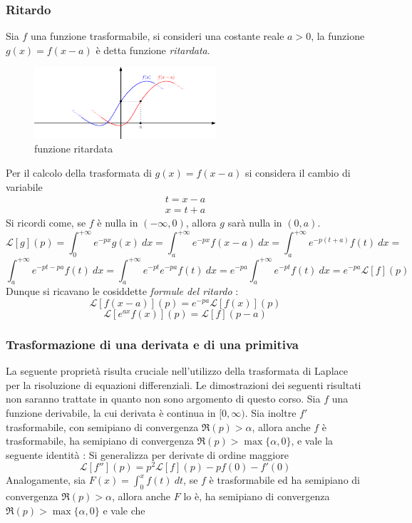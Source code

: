 \documentclass[10pt, letterpaper]{report}
\begin{document}
\subsubsection{Ritardo}
Sia $f$ una funzione trasformabile, si consideri una costante reale $a>0$, la funzione $g(x)=f(x-a)$ è detta 
funzione \textit{ritardata}.\begin{center}
\begin{figure}[h!]\centering
    \includegraphics[width=0.6\textwidth ]{images/funRit.eps}
    \caption{funzione ritardata}
 \end{figure}\end{center}
Per il calcolo della trasformata di $g(x)=f(x-a)$ si considera il cambio di variabile $$\begin{matrix}
    t=x-a\\ x=t+a
\end{matrix} $$
Si ricordi come, se $f$ è nulla in $(-\infty,0)$, allora $g$ sarà nulla in $(0,a)$.
$$ 
\mathcal{L}[g](p)=\int_0^{+\infty}e^{-px}g(x)\ dx =\int_a^{+\infty}e^{-px}f(x-a)\ dx  =
\int_a^{+\infty}e^{-p(t+a)}f(t)\ dx = 
$$ 
$$ 
\int_a^{+\infty}e^{-pt-pa}f(t)\ dx 
= \int_a^{+\infty}e^{-pt}e^{-pa}f(t)\ dx = e^{-pa}\int_a^{+\infty}e^{-pt}f(t)\ dx = 
e^{-pa}\mathcal{L}[f](p)$$
Dunque si ricavano le cosiddette \textit{formule del ritardo} : 
$$ 
\mathcal{L}[f(x-a)](p)=e^{-pa}\mathcal{L}[f(x)](p)
$$ $$ 
\mathcal{L}[e^{ax}f(x)](p)=\mathcal{L}[f](p-a)
$$
\subsubsection{Trasformazione di una derivata e di una primitiva}
La seguente proprietà risulta cruciale nell'utilizzo della trasformata di Laplace per la risoluzione di 
equazioni differenziali. Le dimostrazioni dei seguenti risultati non saranno trattate in quanto non 
sono argomento di questo corso.\acc 
Sia $f$ una funzione derivabile, la cui derivata è continua in $[0,\infty)$. Sia inoltre $f'$ trasformabile, con 
semipiano di convergenza $\Re(p)>\alpha$, allora anche $f$ è trasformabile, ha semipiano di 
convergenza $\Re(p)>\max\{\alpha,0\}$, e vale la seguente identità :
Si generalizza per derivate di ordine maggiore 
$$ 
\mathcal{L}[f''](p)=p^2\mathcal{L}[f](p)-pf(0)-f'(0)
$$
Analogamente, sia $F(x)=\int_0^x f(t)\ dt$, se $f$ è trasformabile ed ha semipiano di convergenza  $\Re(p)>\alpha$, 
allora anche $F$ lo è, ha semipiano di convergenza $\Re(p)>\max\{\alpha,0\}$ e vale che 
\end{document}
